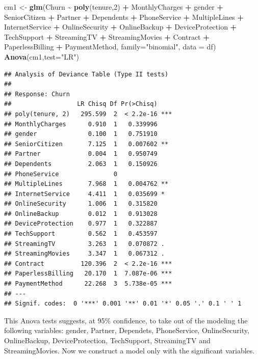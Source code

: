 \documentclass[
]{article}
\newenvironment{Shaded}{\begin{snugshade}}{\end{snugshade}}
\newcommand{\AttributeTok}[1]{\textcolor[rgb]{0.13,0.29,0.53}{#1}}
\newcommand{\DecValTok}[1]{\textcolor[rgb]{0.00,0.00,0.81}{#1}}
\newcommand{\FunctionTok}[1]{\textcolor[rgb]{0.13,0.29,0.53}{\textbf{#1}}}
\newcommand{\NormalTok}[1]{#1}
\newcommand{\OtherTok}[1]{\textcolor[rgb]{0.56,0.35,0.01}{#1}}
\newcommand{\SpecialCharTok}[1]{\textcolor[rgb]{0.81,0.36,0.00}{\textbf{#1}}}
\newcommand{\StringTok}[1]{\textcolor[rgb]{0.31,0.60,0.02}{#1}}
\begin{document}
\begin{Shaded}
\begin{Highlighting}[]
\NormalTok{cm1 }\OtherTok{\textless{}{-}} \FunctionTok{glm}\NormalTok{(Churn }\SpecialCharTok{\textasciitilde{}} \FunctionTok{poly}\NormalTok{(tenure,}\DecValTok{2}\NormalTok{) }\SpecialCharTok{+}\NormalTok{ MonthlyCharges }\SpecialCharTok{+}\NormalTok{ gender }\SpecialCharTok{+}\NormalTok{ SeniorCitizen }\SpecialCharTok{+}\NormalTok{ Partner }\SpecialCharTok{+}\NormalTok{ Dependents }\SpecialCharTok{+}\NormalTok{ PhoneService }\SpecialCharTok{+}\NormalTok{ MultipleLines }\SpecialCharTok{+}\NormalTok{ InternetService }\SpecialCharTok{+}\NormalTok{ OnlineSecurity }\SpecialCharTok{+}\NormalTok{ OnlineBackup }\SpecialCharTok{+}\NormalTok{ DeviceProtection }\SpecialCharTok{+}\NormalTok{ TechSupport }\SpecialCharTok{+}\NormalTok{ StreamingTV }\SpecialCharTok{+}\NormalTok{ StreamingMovies }\SpecialCharTok{+}\NormalTok{ Contract }\SpecialCharTok{+}\NormalTok{ PaperlessBilling }\SpecialCharTok{+}\NormalTok{ PaymentMethod, }\AttributeTok{family=}\StringTok{"binomial"}\NormalTok{, }\AttributeTok{data =}\NormalTok{ df)}
\FunctionTok{Anova}\NormalTok{(cm1,}\AttributeTok{test=}\StringTok{"LR"}\NormalTok{)}
\end{Highlighting}
\end{Shaded}

\begin{verbatim}
## Analysis of Deviance Table (Type II tests)
## 
## Response: Churn
##                  LR Chisq Df Pr(>Chisq)    
## poly(tenure, 2)   295.599  2  < 2.2e-16 ***
## MonthlyCharges      0.910  1   0.339996    
## gender              0.100  1   0.751910    
## SeniorCitizen       7.125  1   0.007602 ** 
## Partner             0.004  1   0.950749    
## Dependents          2.063  1   0.150926    
## PhoneService               0               
## MultipleLines       7.968  1   0.004762 ** 
## InternetService     4.411  1   0.035699 *  
## OnlineSecurity      1.006  1   0.315820    
## OnlineBackup        0.012  1   0.913028    
## DeviceProtection    0.977  1   0.322887    
## TechSupport         0.562  1   0.453597    
## StreamingTV         3.263  1   0.070872 .  
## StreamingMovies     3.347  1   0.067312 .  
## Contract          120.396  2  < 2.2e-16 ***
## PaperlessBilling   20.170  1  7.087e-06 ***
## PaymentMethod      22.268  3  5.738e-05 ***
## ---
## Signif. codes:  0 '***' 0.001 '**' 0.01 '*' 0.05 '.' 0.1 ' ' 1
\end{verbatim}

This Anova tests suggests, at 95\% confidence, to take out of the
modeling the following variables: gender, Partner, Dependets,
PhoneService, OnlineSecurity, OnlineBackup, DeviceProtection,
TechSupport, StreamingTV and StreamingMovies. Now we construct a model
only with the significant variables.
\end{document}
